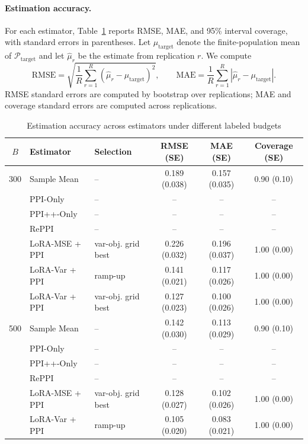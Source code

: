 \documentclass[11pt]{article}
\newcommand{\NA}{\multicolumn{1}{c}{--}}
\begin{document}
\paragraph{Estimation accuracy.}
For each estimator, Table~\ref{tab:estimator_accuracy} reports RMSE, MAE, and 95\% interval
coverage, with standard errors in parentheses. Let $\mu_{\mathrm{target}}$ denote the
finite-population mean of $\mathcal{P}_{\mathrm{target}}$ and let $\hat\mu_r$ be the estimate from
replication $r$. We compute
\[
    \mathrm{RMSE}
    =
    \sqrt{\frac{1}{R}\sum_{r=1}^R(\hat\mu_r-\mu_{\mathrm{target}})^2},
    \qquad
    \mathrm{MAE}
    =
    \frac{1}{R}\sum_{r=1}^R|\hat\mu_r-\mu_{\mathrm{target}}|.
\]
RMSE standard errors are computed by bootstrap over replications; MAE and coverage standard errors
are computed across replications.
\begin{table}[H]
\centering
\caption{Estimation accuracy across estimators under different labeled budgets}
\label{tab:estimator_accuracy}
\scriptsize
\setlength{\tabcolsep}{4.0pt}
\renewcommand{\arraystretch}{1.08}
\begin{tabularx}{\textwidth}{@{}c X l c c c@{}}
\toprule
$B$ & Estimator & Selection & RMSE (SE) & MAE (SE) & Coverage (SE) \\
\midrule
300 & Sample Mean & -- & 0.189 (0.038) & 0.157 (0.035) & 0.90 (0.10) \\
    & PPI-Only & -- & \NA & \NA & \NA \\
    & PPI++-Only & -- & \NA & \NA & \NA \\
    & RePPI & -- & \NA & \NA & \NA \\
    & LoRA-MSE + PPI & var-obj. grid best & 0.226 (0.032) & 0.196 (0.037) & 1.00 (0.00) \\
    & LoRA-Var + PPI & ramp-up & 0.141 (0.021) & 0.117 (0.026) & 1.00 (0.00) \\
    & LoRA-Var + PPI & var-obj. grid best & 0.127 (0.023) & 0.100 (0.026) & 1.00 (0.00) \\
\midrule
500 & Sample Mean & -- & 0.142 (0.030) & 0.113 (0.029) & 0.90 (0.10) \\
    & PPI-Only & -- & \NA & \NA & \NA \\
    & PPI++-Only & -- & \NA & \NA & \NA \\
    & RePPI & -- & \NA & \NA & \NA \\
    & LoRA-MSE + PPI & var-obj. grid best & 0.128 (0.027) & 0.102 (0.026) & 1.00 (0.00) \\
    & LoRA-Var + PPI & ramp-up & 0.105 (0.020) & 0.083 (0.021) & 1.00 (0.00) \\

\end{tabularx}
\end{table}
\end{document}
